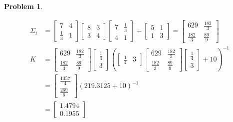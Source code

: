 \documentclass{article}
\newtheorem{problem}{Problem}
\begin{document}
\begin{problem}
\begin{itemize}
\begin{tcolorbox}
\begin{align*}
 \Sigma_t &= \begin{bmatrix}
        7 & 4
        \\
        \frac{1}{3} & 1
       \end{bmatrix} \begin{bmatrix}
       8 & 3 \\
       3 & 4
       \end{bmatrix}\begin{bmatrix}
        7 & \frac{1}{3} 
        \\
        4 & 1
       \end{bmatrix} + \begin{bmatrix}
       5 & 1 \\
       1 & 3
       \end{bmatrix}
       =
       \begin{bmatrix}
        629 & \frac{182}{3}
        \\
        \frac{182}{3} & \frac{89}{9}
       \end{bmatrix}
       \\
K &= \begin{bmatrix}
        629 & \frac{182}{3}
        \\
        \frac{182}{3} & \frac{89}{9}
       \end{bmatrix}
       \begin{bmatrix}
        \frac{1}{4}
        \\
        3
       \end{bmatrix}
       \left(
       \begin{bmatrix}
        \frac{1}{4}
        &
        3
       \end{bmatrix}
       \begin{bmatrix}
        629 & \frac{182}{3}
        \\
        \frac{182}{3} & \frac{89}{9}
       \end{bmatrix}
       \begin{bmatrix}
        \frac{1}{4}
        \\
        3
       \end{bmatrix}
       +
       10
       \right)^{-1}
       \\
       &=
       \begin{bmatrix}
        \frac{1357}{4}
        \\
        \frac{269}{6}
       \end{bmatrix}
       \left(
       219.3125+10
       \right)^{-1}
       \\
       &=
        \begin{bmatrix}
        1.4794
        \\
        0.1955
       \end{bmatrix}
\end{align*}



\end{tcolorbox}

\end{itemize}


\end{problem}
\end{document}
